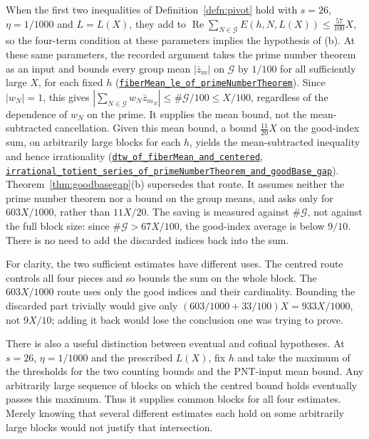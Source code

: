 When the first two inequalities of Definition~\ref{defn:pivot} hold with
$s=26$, $\eta=1/1000$ and $L=L(X)$, they add to
$\operatorname{Re}\sum_{N\in\mathcal G}E(h,N,L(X))\le\tfrac{57}{100}X$, so
the four-term condition at these parameters implies the hypothesis of (b).
At these same parameters, the recorded argument takes the prime number
theorem as an input and bounds every group mean $|\bar z_m|$ on
$\mathcal G$ by $1/100$ for all sufficiently large $X$, for each fixed $h$
(\href{https://github.com/wcook04/plectis-erdos/blob/24edbddbe2bd68e920327a701aad0b9dd0d69675/lean/ErdosProblems/Erdos249/PaperCompleteR21/FiberMeanOfPrimeNumberTheorem.lean\#L935}{\texttt{fiberMean\_le\_of\_primeNumberTheorem}}).
Since $|w_N|=1$, this gives
$|\sum_{N\in\mathcal G}w_N\bar z_{m_N}|\le\#\mathcal G/100\le X/100$,
regardless of the dependence of $w_N$ on the prime. It supplies the mean
bound, not the mean-subtracted cancellation. Given this mean bound,
a bound $\tfrac{11}{20}X$ on the good-index sum, on arbitrarily large
blocks for each $h$, yields the mean-subtracted inequality and hence irrationality
(\href{https://github.com/wcook04/plectis-erdos/blob/24edbddbe2bd68e920327a701aad0b9dd0d69675/lean/ErdosProblems/ArgumentGraph/Results/Erdos249.lean\#L45}{\texttt{dtw\_of\_fiberMean\_and\_centered}},
\href{https://github.com/wcook04/plectis-erdos/blob/24edbddbe2bd68e920327a701aad0b9dd0d69675/lean/ErdosProblems/ArgumentGraph/Results/Erdos249Route.lean\#L118}{\texttt{irrational\_totient\_series\_of\_primeNumberTheorem\_and\_goodBase\_gap}}).
Theorem~\ref{thm:goodbasegap}(b) supersedes that route. It assumes
neither the prime number theorem nor a bound on the group means, and
asks only for $603X/1000$, rather than $11X/20$. The saving is measured
against $\#\mathcal G$, not against the full block size: since
$\#\mathcal G>67X/100$, the good-index average is below $9/10$.
There is no need to add the discarded indices back into the sum.

For clarity, the two sufficient estimates have different uses. The
centred route controls all four pieces and so bounds the sum on the
whole block. The $603X/1000$ route uses only the good indices and their
cardinality. Bounding the discarded part trivially would give only
$(603/1000+33/100)X=933X/1000$, not $9X/10$; adding it back would
lose the conclusion one was trying to prove.

There is also a useful distinction between eventual and cofinal
hypotheses. At $s=26$, $\eta=1/1000$ and the prescribed $L(X)$, fix
$h$ and take the maximum of the thresholds for the two counting bounds
and the PNT-input mean bound. Any arbitrarily large sequence of blocks
on which the centred bound holds eventually passes this maximum.
Thus it supplies common blocks for all four estimates. Merely knowing
that several different estimates each hold on some arbitrarily large
blocks would not justify that intersection.


